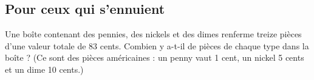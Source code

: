 \vspace{2em}
\subsection{Pour ceux qui s'ennuient}
Une boîte contenant des pennies, des nickels et des dimes renferme treize pièces d'une valeur totale de 83 cents.
Combien y a-t-il de pièces de chaque type dans la boîte ?
(Ce sont des pièces américaines : un penny vaut 1 cent, un nickel 5 cents et un dime 10 cents.)


